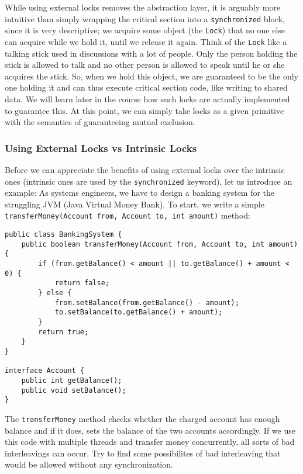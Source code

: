 \documentclass[main.tex]{subfiles}
\begin{document}
While using external locks removes the abstraction layer, it is arguably more intuitive than simply wrapping the critical section into a \texttt{synchronized} block, since it is very descriptive; we acquire some object (the \texttt{Lock}) that no one else can acquire while we hold it, until we release it again. Think of the \texttt{Lock} like a talking stick used in discussions with a lot of people. Only the person holding the stick is allowed to talk and no other person is allowed to speak until he or she acquires the stick. So, when we hold this object, we are guaranteed to be the only one holding it and can thus execute critical section code, like writing to shared data. We will learn later in the course how such locks are actually implemented to guarantee this. At this point, we can simply take locks as a given primitive with the semantics of guaranteeing mutual exclusion.

\subsubsection{Using External Locks vs Intrinsic Locks}
Before we can appreciate the benefits of using external locks over the intrinsic ones (intrinsic ones are used by the \texttt{synchronized} keyword), let us introduce an example: As systems engineers, we have to design a banking system for the struggling JVM (Java Virtual Money Bank). To start, we write a simple \texttt{transferMoney(Account from, Account to, int amount)} method:

\begin{verbatim}
public class BankingSystem {
    public boolean transferMoney(Account from, Account to, int amount) {
        if (from.getBalance() < amount || to.getBalance() + amount < 0) {
            return false;
        } else {
            from.setBalance(from.getBalance() - amount);
            to.setBalance(to.getBalance() + amount);
        }
        return true;
    }
}

interface Account {
    public int getBalance();
    public void setBalance();
}
\end{verbatim}

\noindent The \texttt{transferMoney} method checks whether the charged account has enough balance and if it does, sets the balance of the two accounts accordingly. If we use this code with multiple threads and transfer money concurrently, all sorts of bad interleavings can occur. Try to find some possibilites of bad interleaving that would be allowed without any synchronization.
\end{document}
